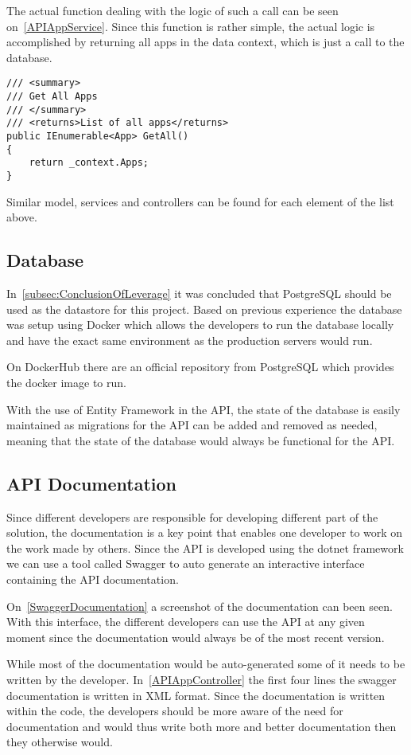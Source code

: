 The actual function dealing with the logic of such a call can be seen on~\autoref{APIAppService}.
Since this function is rather simple, the actual logic is accomplished by returning all apps in the data context, which is just a call to the database.

\begin{lstlisting}[caption={API App Controller GetAll Function}, label={APIAppService}, language={CSharp}]
/// <summary>
/// Get All Apps
/// </summary>
/// <returns>List of all apps</returns>
public IEnumerable<App> GetAll()
{
    return _context.Apps;
}
\end{lstlisting}

Similar model, services and controllers can be found for each element of the list above.

\subsection{Database}

In~\autoref{subsec:ConclusionOfLeverage} it was concluded that PostgreSQL should be used as the datastore for this project.
Based on previous experience the database was setup using Docker which allows the developers to run the database locally and have the exact same environment as the production servers would run.

On DockerHub there are an official repository from PostgreSQL which provides the docker image to run\cite{DockerHubPostgreSQL}.

With the use of Entity Framework in the API, the state of the database is easily maintained as migrations for the API can be added and removed as needed, meaning that the state of the database would always be functional for the API\cite{EntityFramework}.

\subsection{API Documentation}

Since different developers are responsible for developing different part of the solution, the documentation is a key point that enables one developer to work on the work made by others.
Since the API is developed using the dotnet framework we can use a tool called Swagger to auto generate an interactive interface containing the API documentation\cite{SwaggerIO}.

On~\autoref{SwaggerDocumentation} a screenshot of the documentation can been seen.
With this interface, the different developers can use the API at any given moment since the documentation would always be of the most recent version.


While most of the documentation would be auto-generated some of it needs to be written by the developer.
In~\autoref{APIAppController} the first four lines the swagger documentation is written in XML format.
Since the documentation is written within the code, the developers should be more aware of the need for documentation and would thus write both more and better documentation then they otherwise would.
